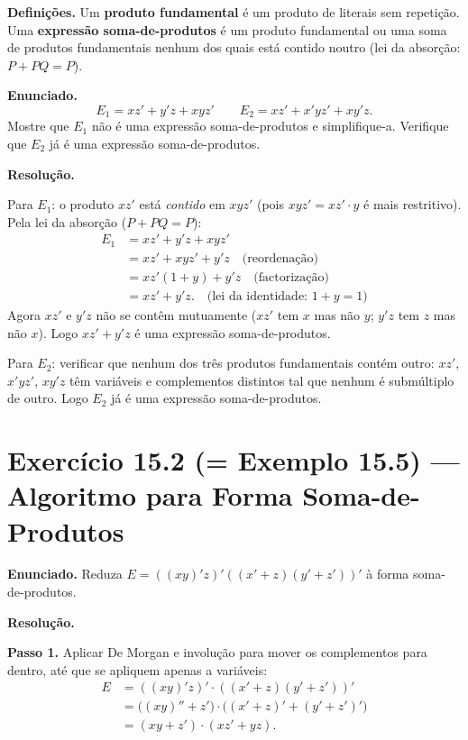 \documentclass[12pt,a4paper]{article}
\newcommand{\keyword}[1]{\textbf{\textcolor{azul}{#1}}}
\newcommand{\passo}[1]{\medskip\noindent\textcolor{verde}{\textbf{Passo #1.}}\;}
\begin{document}
\begin{teoriacaixa}
\textbf{Definições.}
Um \keyword{produto fundamental} é um produto de literais sem repetição. Uma
\keyword{expressão soma-de-produtos} é um produto fundamental ou uma soma de produtos
fundamentais nenhum dos quais está contido noutro (lei da absorção: $P + PQ = P$).
\end{teoriacaixa}

\textbf{Enunciado.}
\[
  E_1 = xz' + y'z + xyz' \qquad E_2 = xz' + x'yz' + xy'z.
\]
Mostre que $E_1$ não é uma expressão soma-de-produtos e simplifique-a. Verifique que
$E_2$ já é uma expressão soma-de-produtos.

\medskip
\textbf{Resolução.}

Para $E_1$: o produto $xz'$ está \emph{contido} em $xyz'$ (pois $xyz' = xz' \cdot y$
é mais restritivo). Pela lei da absorção ($P + PQ = P$):
\begin{align*}
  E_1 &= xz' + y'z + xyz'\\
      &= xz' + xyz' + y'z \quad \text{(reordenação)}\\
      &= xz'(1 + y) + y'z \quad \text{(factorização)}\\
      &= xz' + y'z. \quad \text{(lei da identidade: } 1 + y = 1 \text{)}
\end{align*}
Agora $xz'$ e $y'z$ não se contêm mutuamente ($xz'$ tem $x$ mas não $y$; $y'z$ tem $z$
mas não $x$). Logo $xz' + y'z$ é uma expressão soma-de-produtos.

Para $E_2$: verificar que nenhum dos três produtos fundamentais contém outro:
$xz'$, $x'yz'$, $xy'z$ têm variáveis e complementos distintos tal que nenhum é
submúltiplo de outro. Logo $E_2$ já é uma expressão soma-de-produtos.

\section*{Exercício 15.2 (= Exemplo 15.5) — Algoritmo para Forma Soma-de-Produtos}

\textbf{Enunciado.} Reduza $E = ((xy)'z)'((x'+z)(y'+z'))'$ à forma soma-de-produtos.

\medskip
\textbf{Resolução.}

\passo{1} Aplicar De Morgan e involução para mover os complementos para dentro, até
que se apliquem apenas a variáveis:
\begin{align*}
  E &= ((xy)'z)' \cdot ((x'+z)(y'+z'))'\\
    &= \bigl((xy)'' + z'\bigr) \cdot \bigl((x'+z)' + (y'+z')'\bigr)\\
    &= (xy + z') \cdot (xz' + yz).
\end{align*}
\end{document}

